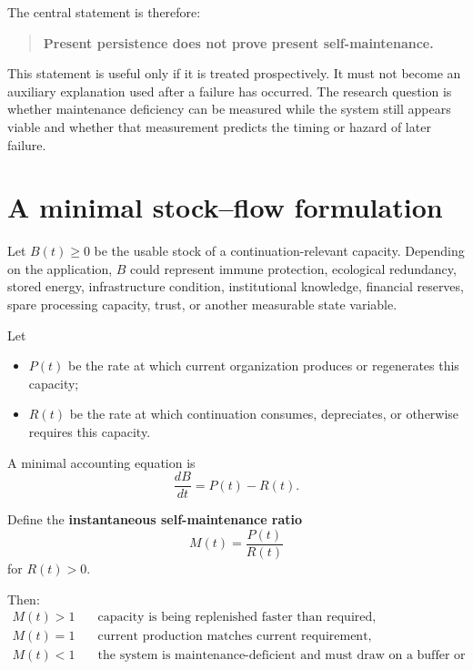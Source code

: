 \documentclass[11pt,a4paper]{article}
\begin{document}
The central statement is therefore:

\begin{quote}
\textbf{Present persistence does not prove present self-maintenance.}
\end{quote}

This statement is useful only if it is treated prospectively. It must not become an auxiliary explanation used after a failure has occurred. The research question is whether maintenance deficiency can be measured while the system still appears viable and whether that measurement predicts the timing or hazard of later failure.

\section{A minimal stock--flow formulation}

Let $B(t)\ge 0$ be the usable stock of a continuation-relevant capacity. Depending on the application, $B$ could represent immune protection, ecological redundancy, stored energy, infrastructure condition, institutional knowledge, financial reserves, spare processing capacity, trust, or another measurable state variable.

Let
\begin{itemize}[nosep]
    \item $P(t)$ be the rate at which current organization produces or regenerates this capacity;
    \item $R(t)$ be the rate at which continuation consumes, depreciates, or otherwise requires this capacity.
\end{itemize}

A minimal accounting equation is
\begin{equation}
\frac{dB}{dt}=P(t)-R(t).
\label{eq:buffer}
\end{equation}

Define the \textbf{instantaneous self-maintenance ratio}
\begin{equation}
\boxed{
M(t)=\frac{P(t)}{R(t)}
}
\label{eq:maintenance-ratio}
\end{equation}
for $R(t)>0$.

Then:
\begin{align*}
M(t)>1 &\quad \text{capacity is being replenished faster than required},\\
M(t)=1 &\quad \text{current production matches current requirement},\\
M(t)<1 &\quad \text{the system is maintenance-deficient and must draw on a buffer or external support.}
\end{align*}
\end{document}
